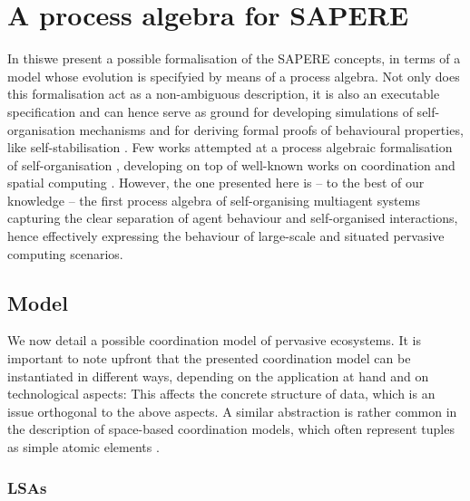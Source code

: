 \documentclass[12pt,a4paper,twoside,openright]{book}
\begin{document}
\chapter{A process algebra for SAPERE}
\label{sapere-process-algebra}
In this\levelText{}we present a possible formalisation of the SAPERE concepts, in terms of a model whose evolution is specifyied by means of a process algebra.
%
Not only does this formalisation act as a non-ambiguous description, it is also an executable specification and can hence serve as ground for developing simulations of self-organisation mechanisms and for deriving formal proofs of behavioural properties, like self-stabilisation \cite{V-SCW2013}.
%
Few works attempted at a process algebraic formalisation of self-organisation \cite{VPB-COORD2012,VDB-FOCLASA-CIC2013}, developing on top of well-known works on coordination and spatial computing \cite{zavattaro2,proto}.
%
However, the one presented here is -- to the best of our knowledge -- the first process algebra of self-organising multiagent systems capturing the clear separation of agent behaviour and self-organised interactions, hence effectively expressing the behaviour of large-scale and situated pervasive computing scenarios.

\section{Model}

We now detail a possible coordination model of pervasive ecosystems.
%
It is important to note upfront that the presented coordination model can be instantiated in different ways, depending on the application at hand and on technological aspects: This affects the concrete structure of data, which is an issue orthogonal to the above aspects.
%
A similar abstraction is rather common in the description of space-based coordination models, which often represent tuples as simple atomic elements \cite{zavattaro}.

\subsection{LSAs}
\end{document}
